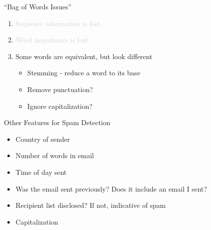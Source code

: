 \documentclass[aspectratio=169]{beamer}
\begin{document}
\begin{frame}{``Bag of Words Issues''}

\begin{enumerate}
\item \textcolor{lightgray}{ Sequence information is lost}
\item \textcolor{lightgray}{Word importance is lost}
\item Some words are equivalent, but look different
\begin{itemize}
\item Stemming - reduce a word to its base
\item Remove punctuation? %
\item Ignore capitalization? %
\end{itemize}
\end{enumerate}
\end{frame}
\begin{frame}{Other Features for Spam Detection}

\begin{itemize}
\item Country of sender
\item Number of words in email
\item Time of day sent
\item Was the email sent previously? Does it include an email I sent?
\item Recipient list disclosed? If not, indicative of spam
\item Capitalization
\end{itemize}
\end{frame}
\end{document}
